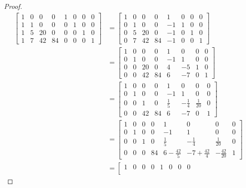 \begin{proof}
  \begin{align*}
  \left[\begin{array}{*{8}{r}}
    1 & 0 & 0  & 0  & 1 & 0 & 0 & 0 \\
    1 & 1 & 0  & 0  & 0 & 1 & 0 & 0 \\
    1 & 5 & 20 & 0  & 0 & 0 & 1 & 0 \\
    1 & 7 & 42 & 84 & 0 & 0 & 0 & 1
  \end{array}\right]
    &= \left[\begin{array}{*{8}{r}}
         1 & 0 & 0  & 0  & 1 & 0 & 0 & 0 \\
         0 & 1 & 0  & 0  &-1 & 1 & 0 & 0 \\
         0 & 5 & 20 & 0  &-1 & 0 & 1 & 0 \\
         0 & 7 & 42 & 84 &-1 & 0 & 0 & 1
       \end{array}\right]
  \\&= \left[\begin{array}{*{8}{r}}
         1 & 0 & 0  & 0  & 1 & 0 & 0 & 0 \\
         0 & 1 & 0  & 0  &-1 & 1 & 0 & 0 \\
         0 & 0 & 20 & 0  & 4 &-5 & 1 & 0 \\
         0 & 0 & 42 & 84 & 6 &-7 & 0 & 1
       \end{array}\right]
  \\&= \left[\begin{array}{*{8}{r}}
         1 & 0 & 0  & 0  & 1 & 0 & 0 & 0 \\
         0 & 1 & 0  & 0  &-1 & 1 & 0 & 0 \\
         0 & 0 & 1  & 0  &\frac{1}{5} &-\frac{1}{4} & \frac{1}{20} & 0 \\
         0 & 0 & 42 & 84 & 6 &-7 & 0 & 1
       \end{array}\right]
  \\&= \left[\begin{array}{*{8}{r}}
         1 & 0 & 0  & 0  & 1 & 0 & 0 & 0 \\
         0 & 1 & 0  & 0  &-1 & 1 & 0 & 0 \\
         0 & 0 & 1  & 0  &\frac{1}{5} &-\frac{1}{4} & \frac{1}{20} & 0 \\
         0 & 0 & 0  & 84 & 6-\frac{42}{5} &-7+\frac{42}{4} & -\frac{42}{20} & 1
       \end{array}\right]
  \\&= \left[\begin{array}{*{8}{r}}
         1 & 0 & 0  & 0  & 1 & 0 & 0 & 0 \\

\end{array}
\end{align*}
\end{proof}
